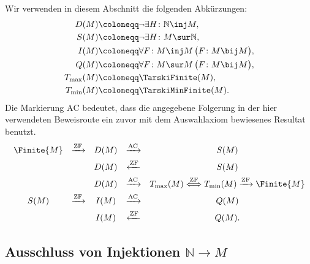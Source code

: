 \documentclass[main.tex]{subfiles}
\begin{document}
Wir verwenden in diesem Abschnitt die folgenden Abkürzungen:
\[
\begin{aligned}
D(M)&\coloneqq \neg\exists H\colon \mathbb{N}\inj M,\\
S(M)&\coloneqq \neg\exists H\colon M\sur\mathbb{N},\\
I(M)&\coloneqq \forall F\colon M\inj M\,\bigl(F\colon M\bij M\bigr),\\
Q(M)&\coloneqq \forall F\colon M\sur M\,\bigl(F\colon M\bij M\bigr),\\
T_{\max}(M)&\coloneqq \TarskiFinite(M),\\
T_{\min}(M)&\coloneqq \TarskiMinFinite(M).
\end{aligned}
\]
Die Markierung \(\mathrm{AC}\) bedeutet, dass die angegebene Folgerung in
der hier verwendeten Beweisroute ein zuvor mit dem Auswahlaxiom bewiesenes
Resultat benutzt.
\[
\begin{array}{ccccc}
\Finite{M} & \xrightarrow{\mathrm{ZF}} & D(M)
  & \xrightarrow{\mathrm{AC}} & S(M)\\[1.1ex]
&& D(M) & \xleftarrow{\mathrm{ZF}} & S(M)\\[1.1ex]
&& D(M) & \xrightarrow{\mathrm{AC}} &
  T_{\max}(M)\overset{\mathrm{ZF}}{\Longleftrightarrow}
  T_{\min}(M)\xrightarrow{\mathrm{ZF}}\Finite{M}\\[1.1ex]
S(M) & \xrightarrow{\mathrm{ZF}} & I(M)
  & \xrightarrow{\mathrm{AC}} & Q(M)\\[1.1ex]
&& I(M) & \xleftarrow{\mathrm{ZF}} & Q(M).
\end{array}
\]

\subsection[Ausschluss von Injektionen N -> M]{%
  Ausschluss von Injektionen \(\mathbb{N}\to M\)}

\begin{tabproof}
\end{tabproof}
\end{document}
